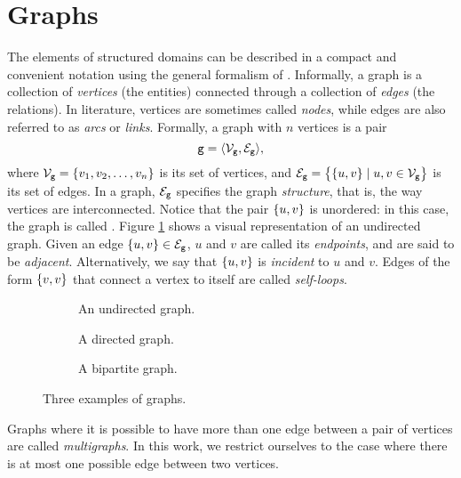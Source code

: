 \section{Graphs}\label{sec:graphs}
The elements of structured domains can be described in a compact and convenient notation using the general formalism of  \citep{bondy1976graph}. Informally, a graph is a collection of \emph{vertices} (the entities) connected through a collection of \emph{edges} (the relations). In literature, vertices are sometimes called \emph{nodes}, while edges are also referred to as \emph{arcs} or \emph{links}. Formally, a graph with $n$ vertices is a pair
$$\Graph{g} =\langle \Nodes{g}, \Edges{g}\rangle,$$
where $\Nodes{g}= \Set{v_1, v_2, \ldots, v_n}$ is its set of vertices, and $\Edges{g} = \Set{\{u, v\} \mid u, v \in \Nodes{g}}$ is its set of edges. In a graph, $\Edges{g}$  specifies the graph \emph{structure}, that is, the way vertices are interconnected. Notice that the pair $\left\{ u,v \right\}$ is unordered: in this case, the graph is called . Figure \ref{fig:undirected-graph} shows a visual representation of an undirected graph.
Given an edge $\Set{u, v} \in \Edges{g}$, $u$ and $v$ are called its \emph{endpoints}, and are said to be \emph{adjacent}. Alternatively, we say that $\left\{ u, v \right\}$ is \emph{incident} to $u$ and $v$. Edges of the form $\left\{ v,v \right\}$ that connect a vertex to itself are called \emph{self-loops}.
\begin{figure*}
    \begin{subfigure}[b]{0.38\linewidth}
        \centering
        \resizebox{.8\textwidth}{!}{}
        \caption{An undirected graph.}
        \label{fig:undirected-graph}
    \end{subfigure}
    \begin{subfigure}[b]{0.32\linewidth}
        \centering
        \resizebox{.8\textwidth}{!}{}
        \caption{A directed graph.}
        \label{fig:directed-graph}
    \end{subfigure}
    \begin{subfigure}[b]{0.25\linewidth}
        \centering
        \resizebox{.9\textwidth}{!}{}
        \caption{A bipartite graph.}
        \label{fig:bipartite-graph}
    \end{subfigure}
    \caption{Three examples of graphs.}
\end{figure*}
Graphs where it is possible to have more than one edge between a pair of vertices are called \emph{multigraphs}. In this work, we restrict ourselves to the case where there is at most one possible edge between two vertices.

